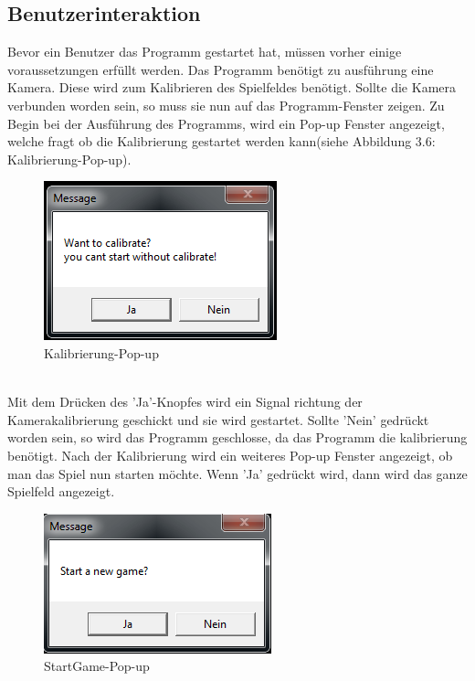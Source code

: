 \subsection{Benutzerinteraktion}

Bevor ein Benutzer das Programm gestartet hat, müssen vorher einige voraussetzungen erfüllt werden. Das Programm benötigt zu ausführung eine Kamera. Diese wird zum Kalibrieren des Spielfeldes benötigt. Sollte die Kamera verbunden worden sein, so muss sie nun auf das Programm-Fenster zeigen. Zu Begin bei der Ausführung des Programms, wird ein Pop-up Fenster angezeigt, welche fragt ob die Kalibrierung gestartet werden kann(siehe Abbildung 3.6: Kalibrierung-Pop-up).
 \begin{figure}[h]
	\centering
	\caption{Kalibrierung-Pop-up}
	\includegraphics[width=\textwidth/3]{bilder/Calibrate-Popup.png}
\end{figure}\\
Mit dem Drücken des 'Ja'-Knopfes wird ein Signal richtung der Kamerakalibrierung geschickt und sie wird gestartet. Sollte 'Nein' gedrückt worden sein, so wird das Programm geschlosse, da das Programm die kalibrierung benötigt.
Nach der Kalibrierung wird ein weiteres Pop-up Fenster angezeigt, ob man das Spiel nun starten möchte. Wenn 'Ja' gedrückt wird, dann wird das ganze Spielfeld angezeigt. 
 \begin{figure}[h]
	\centering
	\caption{StartGame-Pop-up}
	\includegraphics[width=\textwidth/3]{bilder/startGame-Popup.png}
\end{figure}\\
